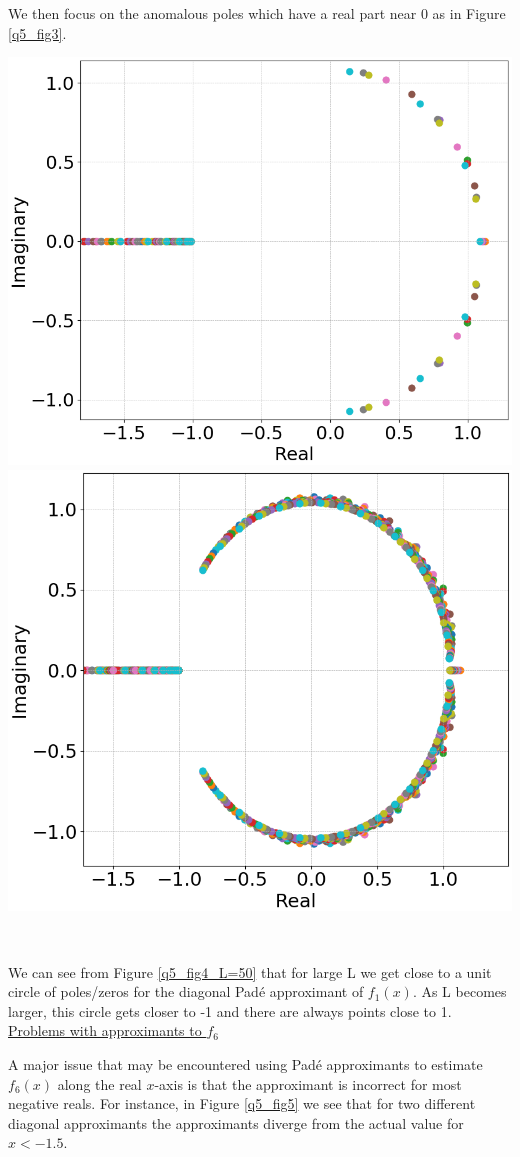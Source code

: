 \documentclass[12pt, a4paper]{article}
\begin{document}
\vspace{0.2cm}

We then focus on the anomalous poles which have a real part near 0 as in Figure \ref{q5_fig3}.

\vspace{0.3cm}
\begin{minipage}{\textwidth}
	\centering
	\includegraphics[width=0.51\linewidth]{q5_fig4_L=20}
	\includegraphics[width=0.48\linewidth]{q5_fig4_L=50}

	\vspace*{-0.2cm}

	\label{q5_fig4_L=50}
\end{minipage}
\\

\vspace{0.4cm}

We can see from Figure \ref{q5_fig4_L=50} that for large L we get close to a unit circle
of poles/zeros for the diagonal Pad\'e approximant of $f_{1}(x)$. As L becomes larger, this
circle gets closer to -1 and there are always points close to 1.
\\

\vspace{0.4cm}
\underline{Problems with approximants to $f_{6}$}

\vspace{0.5cm}
A major issue that may be encountered using Pad\'e approximants to estimate $f_{6}(x)$ along the
real $x$-axis is that the approximant is incorrect for most negative reals. For instance, in
Figure \ref{q5_fig5} we see that for two different diagonal approximants the approximants diverge
from the actual value for $x<-1.5$.\\
\end{document}
